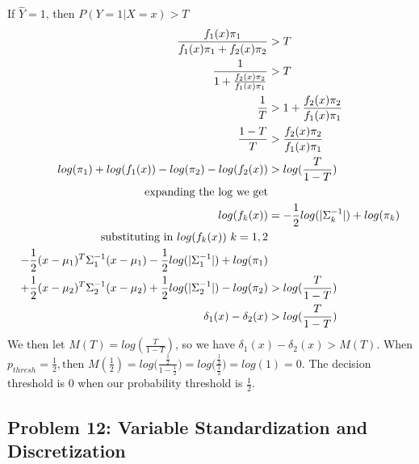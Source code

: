 \documentclass[]{article}
\begin{document}
If \(\hat{Y}=1\), then \(P(Y=1|X=x) > T\) \[
\begin{aligned}
      \frac{f_1(x) \pi_1}{f_1(x) \pi_1 + f_2(x) \pi_2} &> T\\
      \frac{1}{1+\frac{f_2(x) \pi_2}{f_1(x) \pi_1}} &> T\\
      \frac{1}{T} &> 1+\frac{f_2(x) \pi_2}{f_1(x) \pi_1}\\
      \frac{1-T}{T} &> \frac{f_2(x) \pi_2}{f_1(x) \pi_1}\\
      log(\pi_1)+log(f_1(x))-log(\pi_2)-log(f_2(x)) &> log(\frac{T}{1-T}) \\
      \text{expanding the log we get} \\ 
      log(f_k(x)) &= -\frac{1}{2}log(|\Sigma_{k}^{-1}|)+log(\pi_k) \\
      \text{substituting in } log(f_k(x)) \  k=1,2 \\
              - \frac{1}{2}(x-\mu_1)^T\Sigma_{1}^{-1}(x-\mu_1) -\frac{1}{2}log(|\Sigma_{1}^{-1}|)+log(\pi_1)\\
        + \frac{1}{2}(x-\mu_2)^T\Sigma_{2}^{-1}(x-\mu_2) +\frac{1}{2}log(|\Sigma_{2}^{-1}|)-log(\pi_2) &> log(\frac{T}{1-T})\\
        \delta_1(x)-\delta_2(x) &> log(\frac{T}{1-T})\\
\end{aligned}\\
\] We then let \(M(T) = log(\frac{T}{1-T})\), so we have
\(\delta_1(x)-\delta_2(x) > M(T)\). When
\(p_{thresh} = \frac{1}{2}, \text{then } M(\frac{1}{2})=log\Bigg( \frac{\frac{1}{2}}{1-\frac{1}{2}} \Bigg) = log \Big( \frac{\frac{1}{2}}{\frac{1}{2}} \Big) = log(1) = 0\).
The decision threshold is 0 when our probability threshold is
\(\frac{1}{2}\).

\hypertarget{problem-12-variable-standardization-and-discretization}{%
\subsection{Problem 12: Variable Standardization and
Discretization}\label{problem-12-variable-standardization-and-discretization}}
\end{document}
